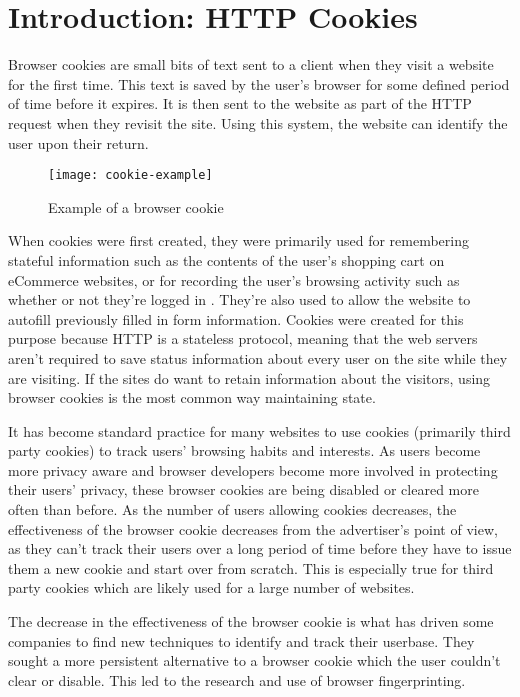 \chapter{Introduction: HTTP Cookies}

Browser cookies are small bits of text sent to a client when they visit a website for the first time.
This text is saved by the user's browser for some defined period of time before it expires.
It is then sent to the website as part of the HTTP request when they revisit the site.
Using this system, the website can identify the user upon their return.

\begin{figure}[h]
\caption{Example of a browser cookie}
\texttt{[image: cookie-example]}
\centering
\end{figure}

When cookies were first created, they were primarily used for remembering stateful information such as the contents of the user's shopping cart on eCommerce websites, or for recording the user's browsing activity such as whether or not they're logged in \citep{cookiesbackground}.
They're also used to allow the website to autofill previously filled in form information.
Cookies were created for this purpose because HTTP is a stateless protocol, meaning that the web servers aren't required to save status information about every user on the site while they are visiting.
If the sites do want to retain information about the visitors, using browser cookies is the most common way maintaining state.

It has become standard practice for many websites to use cookies (primarily third party cookies) to track users' browsing habits and interests.
As users become more privacy aware and browser developers become more involved in protecting their users' privacy, these browser cookies are being disabled or cleared more often than before.
As the number of users allowing cookies decreases, the effectiveness of the browser cookie decreases from the advertiser's point of view, as they can't track their users over a long period of time before they have to issue them a new cookie and start over from scratch.
This is especially true for third party cookies which are likely used for a large number of websites.

The decrease in the effectiveness of the browser cookie is what has driven some companies to find new techniques to identify and track their userbase.
They sought a more persistent alternative to a browser cookie which the user couldn't clear or disable.
This led to the research and use of browser fingerprinting.

